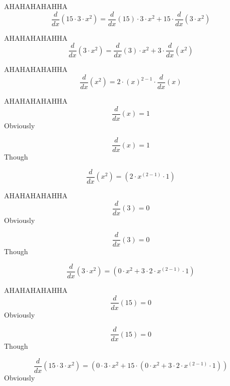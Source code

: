 \documentclass[12pt,a4paper]{extreport}
\begin{document}
AHAHAHAHAHHA
\begin{dmath*}
    \frac{d}{dx}\left(15\cdot 3\cdot x^{2}\right) = \frac{d}{dx}\left(15\right) \cdot 3\cdot x^{2} + 15 \cdot \frac{d}{dx}\left(3\cdot x^{2}\right)
\end{dmath*}

AHAHAHAHAHHA
\begin{dmath*}
    \frac{d}{dx}\left(3\cdot x^{2}\right) = \frac{d}{dx}\left(3\right) \cdot x^{2} + 3 \cdot \frac{d}{dx}\left(x^{2}\right)
\end{dmath*}

AHAHAHAHAHHA
\begin{dmath*}
    \frac{d}{dx}\left(x^{2}\right) = 2 \cdot \left(x\right)^{2 -  1 } \cdot \frac{d}{dx}\left(x\right)
\end{dmath*}

AHAHAHAHAHHA
\begin{dmath*}
    \frac{d}{dx}\left(x\right) =  1 
\end{dmath*}
Obviously


\begin{dmath*}
    \frac{d}{dx} \left(x\right) = 1
\end{dmath*}
Though


\begin{dmath*}
    \frac{d}{dx} \left(x^{2}\right) = \left(2\cdot x^{\left(2-1\right)}\cdot 1\right)
\end{dmath*}

AHAHAHAHAHHA
\begin{dmath*}
    \frac{d}{dx}\left(3\right) =  0 
\end{dmath*}
Obviously


\begin{dmath*}
    \frac{d}{dx} \left(3\right) = 0
\end{dmath*}
Though


\begin{dmath*}
    \frac{d}{dx} \left(3\cdot x^{2}\right) = \left(0\cdot x^{2}+3\cdot 2\cdot x^{\left(2-1\right)}\cdot 1\right)
\end{dmath*}

AHAHAHAHAHHA
\begin{dmath*}
    \frac{d}{dx}\left(15\right) =  0 
\end{dmath*}
Obviously


\begin{dmath*}
    \frac{d}{dx} \left(15\right) = 0
\end{dmath*}
Though


\begin{dmath*}
    \frac{d}{dx} \left(15\cdot 3\cdot x^{2}\right) = \left(0\cdot 3\cdot x^{2}+15\cdot \left(0\cdot x^{2}+3\cdot 2\cdot x^{\left(2-1\right)}\cdot 1\right)\right)
\end{dmath*}
Obviously
\end{document}
